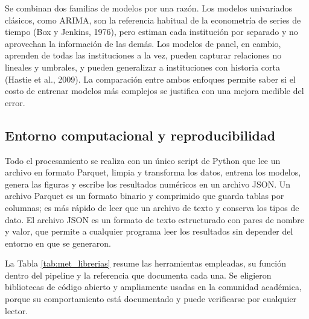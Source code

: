 Se combinan dos familias de modelos por una razón. Los modelos univariados clásicos, como ARIMA, son la referencia habitual de la econometría de series de tiempo (Box y Jenkins, 1976), pero estiman cada institución por separado y no aprovechan la información de las demás. Los modelos de panel, en cambio, aprenden de todas las instituciones a la vez, pueden capturar relaciones no lineales y umbrales, y pueden generalizar a instituciones con historia corta (Hastie et al., 2009). La comparación entre ambos enfoques permite saber si el costo de entrenar modelos más complejos se justifica con una mejora medible del error.

\subsection{Entorno computacional y reproducibilidad}
Todo el procesamiento se realiza con un único script de Python que lee un archivo en formato Parquet, limpia y transforma los datos, entrena los modelos, genera las figuras y escribe los resultados numéricos en un archivo JSON. Un archivo Parquet es un formato binario y comprimido que guarda tablas por columnas; es más rápido de leer que un archivo de texto y conserva los tipos de dato. El archivo JSON es un formato de texto estructurado con pares de nombre y valor, que permite a cualquier programa leer los resultados sin depender del entorno en que se generaron.

La Tabla \ref{tab:met_librerias} resume las herramientas empleadas, su función dentro del pipeline y la referencia que documenta cada una. Se eligieron bibliotecas de código abierto y ampliamente usadas en la comunidad académica, porque su comportamiento está documentado y puede verificarse por cualquier lector.


